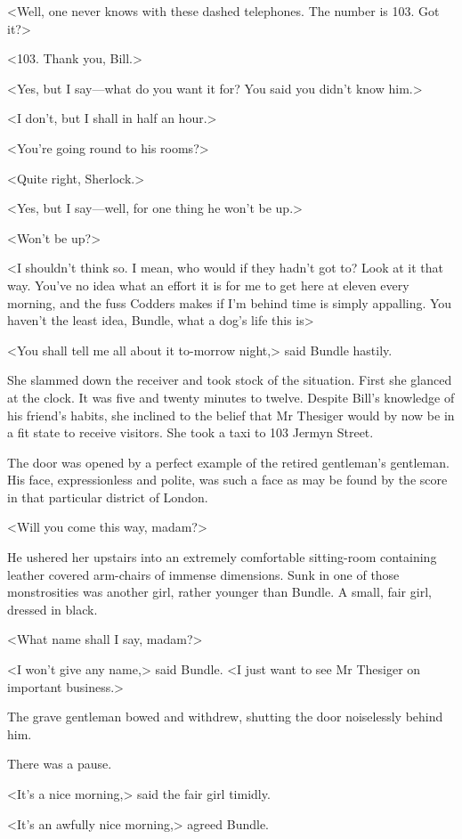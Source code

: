 <Well, one never knows with these dashed telephones. The number is 103. Got it?>

<103. Thank you, Bill.>

<Yes, but I say—what do you want it for? You said you didn't know him.>

<I don't, but I shall in half an hour.>

<You're going round to his rooms?>

<Quite right, Sherlock.>

<Yes, but I say—well, for one thing he won't be up.>

<Won't be up?>

<I shouldn't think so. I mean, who would if they hadn't got to? Look at it that way. You've no idea what an effort it is for me to get here at eleven every morning, and the fuss Codders makes if I'm behind time is simply appalling. You haven't the least idea, Bundle, what a dog's life this is\longdash>

<You shall tell me all about it to-morrow night,> said Bundle hastily.

She slammed down the receiver and took stock of the situation. First she glanced at the clock. It was five and twenty minutes to twelve. Despite Bill's knowledge of his friend's habits, she inclined to the belief that Mr Thesiger would by now be in a fit state to receive visitors. She took a taxi to 103 Jermyn Street.

The door was opened by a perfect example of the retired gentleman's gentleman. His face, expressionless and polite, was such a face as may be found by the score in that particular district of London.

<Will you come this way, madam?>

He ushered her upstairs into an extremely comfortable sitting-room containing leather covered arm-chairs of immense dimensions. Sunk in one of those monstrosities was another girl, rather younger than Bundle. A small, fair girl, dressed in black.

<What name shall I say, madam?>

<I won't give any name,> said Bundle. <I just want to see Mr Thesiger on important business.>

The grave gentleman bowed and withdrew, shutting the door noiselessly behind him.

There was a pause.

<It's a nice morning,> said the fair girl timidly.

<It's an awfully nice morning,> agreed Bundle.

